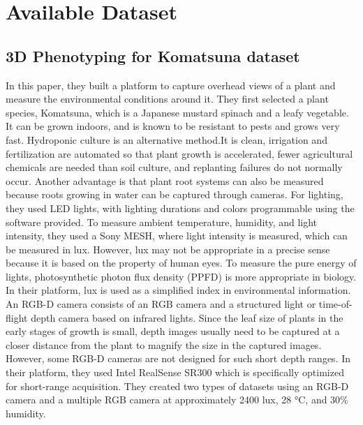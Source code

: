 \section{Available Dataset}

\subsection{3D Phenotyping for Komatsuna dataset}
In this paper, they built a platform to capture overhead views of a plant and measure the environmental conditions around it. They first
selected a plant species, Komatsuna, which is a Japanese mustard spinach and a leafy vegetable. It can be grown indoors, and is known to
be resistant to pests and grows very fast. Hydroponic culture is an alternative method.It is clean, irrigation and fertilization are automated
so that plant growth is accelerated, fewer agricultural chemicals are needed than soil culture, and replanting failures do not normally occur.
Another advantage is that plant root systems can also be measured because roots growing in water can be captured through cameras. For lighting,
they used LED lights, with lighting durations and colors programmable using the software provided. To measure ambient temperature, humidity, and
light intensity, they used a Sony MESH, where light intensity is measured, which can be measured in lux. However, lux may not be appropriate in
a precise sense because it is based on the property of human eyes. To measure the pure energy of lights, photosynthetic photon flux density
(PPFD) is more appropriate in biology. In their platform, lux is used as a simplified index in environmental information. An RGB-D camera
consists of an RGB camera and a structured light or time-of-flight depth camera based on infrared lights. Since the leaf size of plants in the
early stages of growth is small, depth images usually need to be captured at a closer distance from the plant to magnify the size in the
captured images. However, some RGB-D cameras are not designed for such short depth ranges. In their platform, they used Intel RealSense SR300
which is specifically optimized for short-range acquisition.
They created two types of datasets using an RGB-D camera and a multiple RGB camera at approximately 2400 lux, 28 °C, and 30\% humidity.

